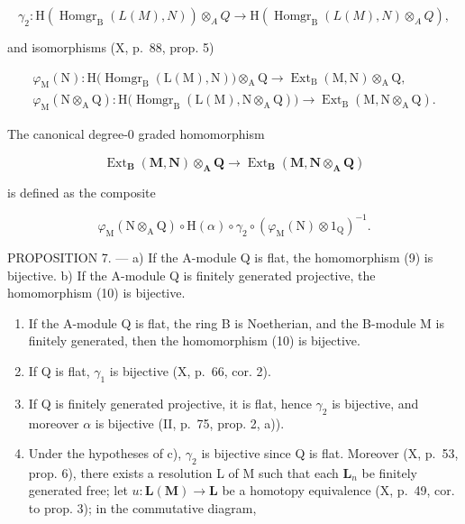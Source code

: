 \[
\gamma_ {2}: \mathrm{H} (\operatorname{Homgr} _ {\mathrm{B}} (L (M), N)) \otimes_ {A} Q \rightarrow \mathrm{H} (\operatorname{Homgr} _ {\mathrm{B}} (L (M), N) \otimes_ {A} Q),
\]

and isomorphisms (X, p.~88, prop. 5)

\[
\begin{array}{c} \varphi_ {\mathrm{M}} (\mathrm{N}): \mathrm{H} \big (\operatorname{Homgr} _ {\mathrm{B}} (\mathrm{L} (\mathrm{M}), \mathrm{N}) \big) \otimes_ {\mathrm{A}} \mathrm{Q} \to \operatorname{Ext} _ {\mathrm{B}} (\mathrm{M}, \mathrm{N}) \otimes_ {\mathrm{A}} \mathrm{Q}, \\ \varphi_ {\mathrm{M}} (\mathrm{N} \otimes_ {\mathrm{A}} \mathrm{Q}): \mathrm{H} \big (\operatorname{Homgr} _ {\mathrm{B}} (\mathrm{L} (\mathrm{M}), \mathrm{N} \otimes_ {\mathrm{A}} \mathrm{Q}) \big) \to \operatorname{Ext} _ {\mathrm{B}} (\mathrm{M}, \mathrm{N} \otimes_ {\mathrm{A}} \mathrm{Q}). \end{array}
\]

The canonical degree-0 graded homomorphism

\[
\operatorname{Ext} _ {\mathbf {B}} (\mathbf {M}, \mathbf {N}) \otimes_ {\mathbf {A}} \mathbf {Q} \rightarrow \operatorname{Ext} _ {\mathbf {B}} (\mathbf {M}, \mathbf {N} \otimes_ {\mathbf {A}} \mathbf {Q})\tag{10}
\]

is defined as the composite

\[
\varphi_ {\mathrm{M}} (\mathrm{N} \otimes_ {\mathrm{A}} \mathrm{Q}) \circ \mathrm{H} (\alpha) \circ \gamma_ {2} \circ \left(\varphi_ {\mathrm{M}} (\mathrm{N}) \otimes 1 _ {\mathrm{Q}}\right) ^ {- 1}.
\]

PROPOSITION 7. --- a) If the A-module Q is flat, the homomorphism (9) is bijective. b) If the A-module Q is finitely generated projective, the homomorphism (10) is bijective.

\begin{enumerate}
\def\labelenumi{\alph{enumi})}
\setcounter{enumi}{2}
\item
  If the A-module Q is flat, the ring B is Noetherian, and the B-module M is finitely generated, then the homomorphism (10) is bijective.
\item
  If Q is flat, \(\gamma_{1}\) is bijective (X, p.~66, cor. 2).
\item
  If Q is finitely generated projective, it is flat, hence \(\gamma_{2}\) is bijective, and moreover \(\alpha\) is bijective (II, p.~75, prop. 2, a)).
\item
  Under the hypotheses of c), \(\gamma_{2}\) is bijective since Q is flat. Moreover (X, p.~53, prop. 6), there exists a resolution L of M such that each \(\mathbf{L}_{n}\) be finitely generated free; let \(u: \mathbf{L}(\mathbf{M}) \to \mathbf{L}\) be a homotopy equivalence (X, p.~49, cor. to prop. 3); in the commutative diagram,
\end{enumerate}

